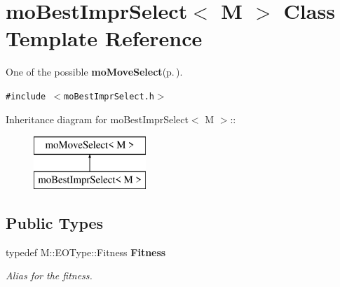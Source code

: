 \section{mo\-Best\-Impr\-Select$<$ M $>$ Class Template Reference}
\label{classmo_best_impr_select}
One of the possible {\bf mo\-Move\-Select}{\rm (p.\,\pageref{classmo_move_select})}.  


{\tt \#include $<$mo\-Best\-Impr\-Select.h$>$}

Inheritance diagram for mo\-Best\-Impr\-Select$<$ M $>$::\begin{figure}[H]
\begin{center}
\leavevmode
\includegraphics[height=2cm]{classmo_best_impr_select}
\end{center}
\end{figure}
\subsection*{Public Types}
\begin{CompactItemize}
\item 
typedef M::EOType::Fitness {\bf Fitness}\label{classmo_best_impr_select_c4ae17435221fb0a8e8acd285210cfcb}

\begin{CompactList}\small\item\em Alias for the fitness. \item\end{CompactList}\end{CompactItemize}
